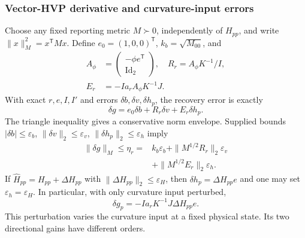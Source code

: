 \documentclass[pdflatex,sn-mathphys-num]{sn-jnl}
\begin{document}
\subsubsection{Vector-HVP derivative and curvature-input errors}
Choose any fixed reporting metric $M\succ0$, independently of $H_{pp}$, and write $\|x\|_M^2=x^{\mathsf T}Mx$. Define $e_0=(1,0,0)^{\mathsf T}$, $k_b=\sqrt{M_{00}}$, and
\begin{equation}
 \begin{aligned}
 A_\phi&=\begin{pmatrix}-\phi e^{\mathsf T}\\\operatorname{Id}_2\end{pmatrix},\quad
 R_r=A_\phi K^{-1}/I,\\
 E_r&=-Ia_r A_\phi K^{-1}J.
 \end{aligned}
 \label{eq:correctedoperator}
\end{equation}
With exact $r,e,I,I'$ and errors $\delta b,\delta v,\delta h_p$, the recovery error is exactly
\begin{equation}
 \delta g=e_0\delta b+R_r\delta v+E_r\delta h_p.
 \label{eq:curvatureerror}
\end{equation}
The triangle inequality gives a conservative norm envelope. Supplied bounds $|\delta b|\leq\varepsilon_b$, $\|\delta v\|_2\leq\varepsilon_v$, $\|\delta h_p\|_2\leq\varepsilon_h$ imply
\begin{equation}
 \begin{aligned}
 \|\delta g\|_M\leq\eta_r={}&k_b\varepsilon_b
 +\|M^{1/2}R_r\|_2\varepsilon_v\\
 &+\|M^{1/2}E_r\|_2\varepsilon_h.
 \end{aligned}
 \label{eq:correctederror}
\end{equation}
If $\widehat H_{pp}=H_{pp}+\Delta H_{pp}$ with $\|\Delta H_{pp}\|_2\leq\varepsilon_H$, then $\delta h_p=\Delta H_{pp}e$ and one may set $\varepsilon_h=\varepsilon_H$. In particular, with only curvature input perturbed,
\begin{equation}
 \delta g_p=-Ia_rK^{-1}J\Delta H_{pp}e.
 \label{eq:curvaturebias}
\end{equation}
This perturbation varies the curvature input at a fixed physical state. Its two directional gains have different orders.
\end{document}
